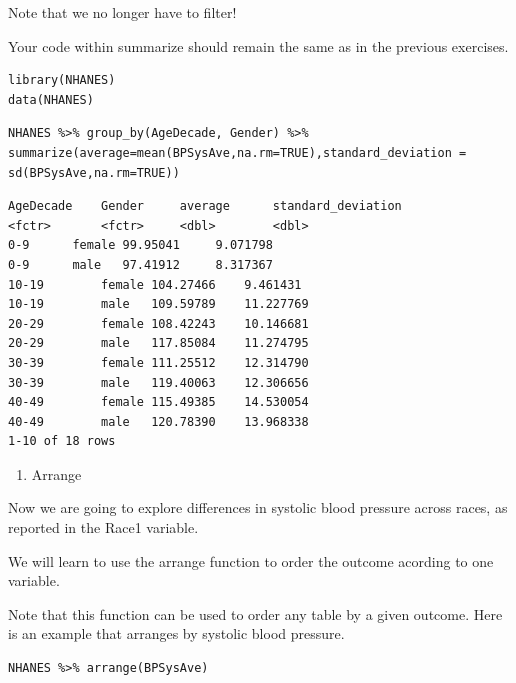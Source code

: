 \documentclass[
]{article}
\providecommand{\tightlist}{%
  \setlength{\itemsep}{0pt}\setlength{\parskip}{0pt}}
\begin{document}
Note that we no longer have to filter!

Your code within summarize should remain the same as in the previous
exercises.

\begin{verbatim}
library(NHANES)
data(NHANES)
\end{verbatim}

\begin{verbatim}
NHANES %>% group_by(AgeDecade, Gender) %>% summarize(average=mean(BPSysAve,na.rm=TRUE),standard_deviation = sd(BPSysAve,na.rm=TRUE))
\end{verbatim}

\begin{verbatim}
AgeDecade    Gender     average      standard_deviation
<fctr>       <fctr>     <dbl>        <dbl>
0-9      female 99.95041     9.071798
0-9      male   97.41912     8.317367
10-19        female 104.27466    9.461431
10-19        male   109.59789    11.227769
20-29        female 108.42243    10.146681
20-29        male   117.85084    11.274795
30-39        female 111.25512    12.314790
30-39        male   119.40063    12.306656
40-49        female 115.49385    14.530054
40-49        male   120.78390    13.968338
1-10 of 18 rows
\end{verbatim}

\begin{enumerate}
\def\labelenumi{\arabic{enumi}.}
\setcounter{enumi}{7}
\tightlist
\item
  Arrange
\end{enumerate}

Now we are going to explore differences in systolic blood pressure
across races, as reported in the Race1 variable.

We will learn to use the arrange function to order the outcome acording
to one variable.

Note that this function can be used to order any table by a given
outcome. Here is an example that arranges by systolic blood pressure.

\begin{verbatim}
NHANES %>% arrange(BPSysAve)
\end{verbatim}
\end{document}
